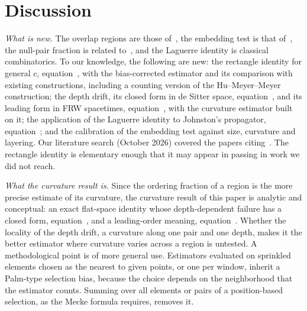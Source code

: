 \documentclass[12pt]{iopart}
\begin{document}
\section{Discussion}\label{sec:disc}
\emph{What is new.} The overlap regions are those of~\cite{BK24}, the embedding test is that of~\cite{CloughEvans16}, the null-pair fraction is related to~\cite{GlaserSurya13}, and the Laguerre identity is classical combinatorics. To our knowledge, the following are new: the rectangle identity for general $c$, equation~, with the bias-corrected estimator and its comparison with existing constructions, including a counting version of the Hu--Meyer--Meyer construction; the depth drift, its closed form in de Sitter space, equation~, and its leading form in FRW spacetimes, equation~, with the curvature estimator built on it; the application of the Laguerre identity to Johnston's propagator, equation~; and the calibration of the embedding test against size, curvature and layering. Our literature search (October 2026) covered the papers citing~\cite{BK24,CloughEvans16,Johnston08,Johnston09}. The rectangle identity is elementary enough that it may appear in passing in work we did not reach.

\emph{What the curvature result is.} Since the ordering fraction of a region is the more precise estimate of its curvature, the curvature result of this paper is analytic and conceptual: an exact flat-space identity whose depth-dependent failure has a closed form, equation~, and a leading-order meaning, equation~. Whether the locality of the depth drift, a curvature along one pair and one depth, makes it the better estimator where curvature varies across a region is untested. A methodological point is of more general use. Estimators evaluated on sprinkled elements chosen as the nearest to given points, or one per window, inherit a Palm-type selection bias, because the choice depends on the neighborhood that the estimator counts. Summing over all elements or pairs of a position-based selection, as the Mecke formula requires, removes it.
\end{document}
